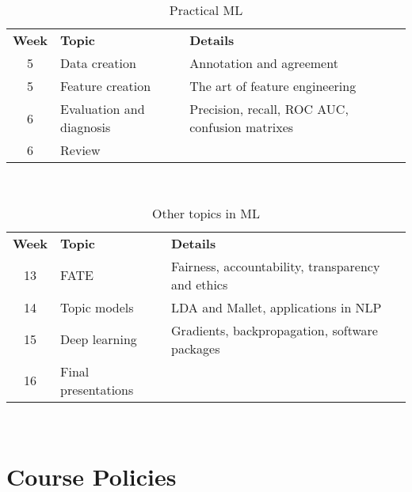 \documentclass[10pt]{memoir}
\begin{document}
\begin{table}[htb!]
\centering
\begin{tabular}{cll}
     \textbf{Week}  & \textbf{Topic} & \textbf{Details}   \\
    \cmidrule[.1em](lr){1-3}
    
     5  & Data creation &  Annotation and agreement \\
    \cmidrule[.1em](lr){1-3} 
 
     5  & Feature creation &  The art of feature engineering \\
    \cmidrule[.1em](lr){1-3} 

     6  & Evaluation and diagnosis &  Precision, recall, ROC AUC, confusion matrixes \\
    \cmidrule[.1em](lr){1-3} 

     6  & Review &   \\
    \cmidrule[.1em](lr){1-3} 

\end{tabular}\\
\caption{Practical ML}
\end{table}

\begin{table}[htb!]
\centering
\begin{tabular}{cll}
     \textbf{Week} & \textbf{Topic} & \textbf{Details}   \\
    \cmidrule[.1em](lr){1-3}
    
     13   & FATE &   Fairness, accountability, transparency and ethics \\
    \cmidrule[.1em](lr){1-3} 
 
     14  & Topic models &  LDA and Mallet, applications in NLP \\
    \cmidrule[.1em](lr){1-3} 

     15  & Deep learning &  Gradients, backpropagation, software packages \\
    \cmidrule[.1em](lr){1-3} 

     16   & Final presentations &   \\
    \cmidrule[.1em](lr){1-3} 
    

\end{tabular}\\
\caption{Other topics in ML}
\end{table}

\clearpage


\section{\textbf{Course Policies}}
\end{document}
